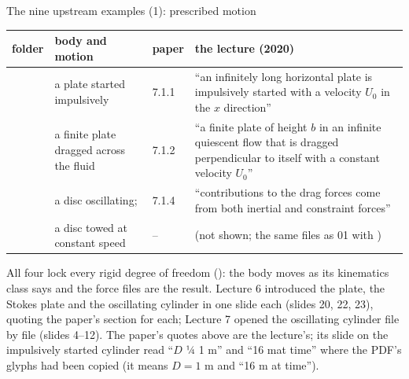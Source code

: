 \documentclass[aspectratio=169,11pt]{beamer}
\begin{document}
\begin{frame}{The nine upstream examples (1): prescribed motion}
\label{fr:nine}
\scriptsize
\setlength{\tabcolsep}{3pt}
\begin{tabular}{@{}L{0.29\textwidth}L{0.2\textwidth}lL{0.38\textwidth}@{}}
\toprule
folder & body and motion & paper & the lecture (2020) \\
\midrule
{} & a plate started impulsively & 7.1.1 & ``an infinitely long horizontal plate is impulsively started with a velocity $U_0$ in the $x$ direction''\\
 & a finite plate dragged across the fluid & 7.1.2 & ``a finite plate of height $b$ in an infinite quiescent flow that is dragged perpendicular to itself with a constant velocity $U_0$''\\
 & a disc oscillating;  & 7.1.4 & ``contributions to the drag forces come from both inertial and constraint forces''\\
 & a disc towed at constant speed & -- & (not shown; the same files as 01 with )\\
\bottomrule
\end{tabular}
\vspace{1mm}

\scriptsize All four lock every rigid degree of freedom (): the body moves as its kinematics class says and the force files are the result. Lecture 6 introduced the plate, the Stokes plate and the oscillating cylinder in one slide each (slides 20, 22, 23), quoting the paper's section for each; Lecture 7 opened the oscillating cylinder file by file (slides 4--12). The paper's quotes above are the lecture's; its slide on the impulsively started cylinder read ``$D$ ¼ 1 m'' and ``16 mat time'' where the PDF's glyphs had been copied (it means $D = 1$ m and ``16 m at time'').
\end{frame}
\end{document}
